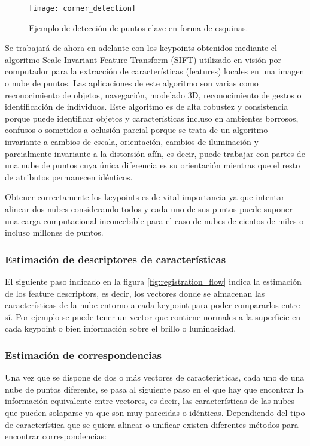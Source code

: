 \begin{figure}
\centering
\texttt{[image: corner\_detection]}
\caption{Ejemplo de detección de puntos clave en forma de esquinas.}\label{fig:corner_detection}
\end{figure}


Se trabajará de ahora en adelante con los keypoints obtenidos mediante el algoritmo Scale Invariant Feature Transform (SIFT) utilizado en visión por computador para la extracción de características (features) locales en una imagen o nube de puntos. Las aplicaciones de este algoritmo son varias como reconocimiento de objetos, navegación, modelado 3D, reconocimiento de gestos o identificación de individuos. Este algoritmo es de alta robustez y consistencia porque puede identificar objetos y características incluso en ambientes borrosos, confusos o sometidos a oclusión parcial porque se trata de un algoritmo invariante a cambios de escala, orientación, cambios de iluminación y parcialmente invariante a la distorsión afín, es decir, puede trabajar con partes de una nube de puntos cuya única diferencia es su orientación mientras que el resto de atributos permanecen idénticos.

Obtener correctamente los keypoints es de vital importancia ya que intentar alinear dos nubes considerando todos y cada uno de sus puntos puede suponer una carga computacional inconcebible para el caso de nubes de cientos de miles o incluso millones de puntos. 

\subsubsection{Estimación de descriptores de características}
El siguiente paso indicado en la figura \ref{fig:registration_flow} indica la estimación de los feature descriptors, es decir, los vectores donde se almacenan las características de la nube entorno a cada keypoint para poder compararlos entre sí. Por ejemplo se puede tener un vector que contiene normales a la superficie en cada keypoint o bien información sobre el brillo o luminosidad.

\subsubsection{Estimación de correspondencias}
Una vez que se dispone de dos o más vectores de características, cada uno de una nube de puntos diferente, se pasa al siguiente paso en el que hay que encontrar la información equivalente entre vectores, es decir, las características de las nubes que pueden solaparse ya que son muy parecidas o idénticas. Dependiendo del tipo de característica que se quiera alinear o unificar existen diferentes métodos para encontrar correspondencias:


